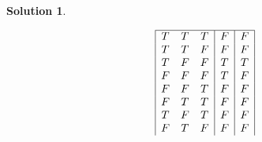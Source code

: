 \documentclass[10pt]{article}
\theoremstyle{definition}
\newtheorem{soln}{Solution}
\begin{document}
\begin{soln}
\begin{enumerate}[label=(\alph*)]
\begin{displaymath}
\begin{array}{|c c c|c|c|}
              \hline %
              T & T & T & F                           & F                                 \\
              T & T & F & F                           & F                                 \\
              T & F & F & T                           & T                                 \\
              F & F & F & T                           & F                                 \\
              F & F & T & F                           & F                                 \\
              F & T & T & F                           & F                                 \\
              T & F & T & F                           & F                                 \\
              F & T & F & F                           & F                                 \\
            \end{array}
          \end{displaymath}
  \end{enumerate}
\end{soln}
\newpage
\end{document}
